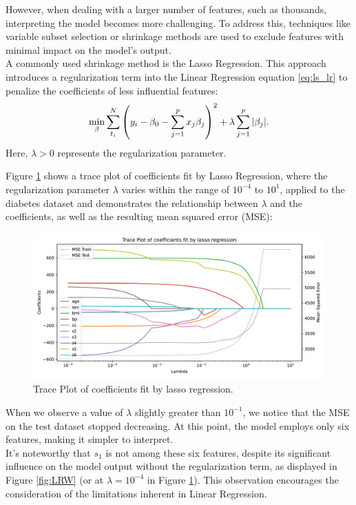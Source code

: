 However, when dealing with a larger number of features, such as thousands, interpreting the model becomes more challenging. To address this, techniques like variable subset selection or shrinkage methods are used to exclude features with minimal impact on the model's output. \\
A commonly used shrinkage method is the Lasso Regression. This approach introduces a regularization term into the Linear Regression equation \ref{eq:ls_lr} to penalize the coefficients of less influential features:
\begin{equation}
    \min_{\beta} \sum_{t_i}^N \left(y_i-\beta_0-\sum_{j=1}^p x_j\beta_j\right)^2 + \lambda \sum_{j=1}^p |\beta_j|.
\end{equation}
Here, $\lambda > 0$ represents the regularization parameter.\cite{hastie2009elements}

Figure \ref{fig:lasso_fit} shows a trace plot of coefficients fit by Lasso Regression, where the regularization parameter $\lambda$ varies within the range of $10^{-4}$ to $10^1$, applied to the diabetes dataset and demonstrates the relationship between $\lambda$ and the coefficients, as well as the resulting mean squared error (MSE):
\begin{figure}[H]
    \centering
    \includegraphics[width=1\linewidth]{pics/Trace_Plot_of_Lasso_Fit.pdf}
    \caption{Trace Plot of coefficients fit by lasso regression.}
    \label{fig:lasso_fit}
\end{figure}

When we observe a value of $\lambda$ slightly greater than $10^{-1}$, we notice that the MSE on the test dataset stopped decreasing. At this point, the model employs only six features, making it simpler to interpret.\\
It's noteworthy that $s_1$ is not among these six features, despite its significant influence on the model output without the regularization term, as displayed in Figure \ref{fig:LRW} (or at $\lambda=10^{-4}$ in Figure \ref{fig:lasso_fit}). This observation encourages the consideration of the limitations inherent in Linear Regression.


